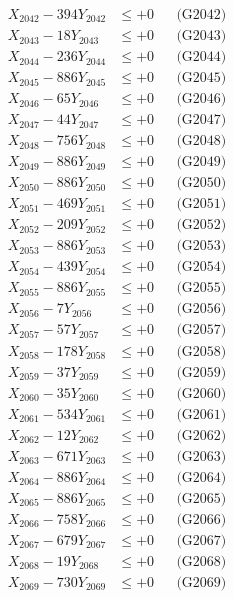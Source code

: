 \documentclass[a4paper,10pt]{article}
\begin{document}
{\begin{align}
X_{2042} - 394Y_{2042} &\leq +0 && \text{(G2042)} \\
X_{2043} - 18Y_{2043} &\leq +0 && \text{(G2043)} \\
X_{2044} - 236Y_{2044} &\leq +0 && \text{(G2044)} \\
X_{2045} - 886Y_{2045} &\leq +0 && \text{(G2045)} \\
X_{2046} - 65Y_{2046} &\leq +0 && \text{(G2046)} \\
X_{2047} - 44Y_{2047} &\leq +0 && \text{(G2047)} \\
X_{2048} - 756Y_{2048} &\leq +0 && \text{(G2048)} \\
X_{2049} - 886Y_{2049} &\leq +0 && \text{(G2049)} \\
X_{2050} - 886Y_{2050} &\leq +0 && \text{(G2050)} \\
\allowbreak
X_{2051} - 469Y_{2051} &\leq +0 && \text{(G2051)} \\
X_{2052} - 209Y_{2052} &\leq +0 && \text{(G2052)} \\
X_{2053} - 886Y_{2053} &\leq +0 && \text{(G2053)} \\
X_{2054} - 439Y_{2054} &\leq +0 && \text{(G2054)} \\
X_{2055} - 886Y_{2055} &\leq +0 && \text{(G2055)} \\
X_{2056} - 7Y_{2056} &\leq +0 && \text{(G2056)} \\
X_{2057} - 57Y_{2057} &\leq +0 && \text{(G2057)} \\
X_{2058} - 178Y_{2058} &\leq +0 && \text{(G2058)} \\
X_{2059} - 37Y_{2059} &\leq +0 && \text{(G2059)} \\
X_{2060} - 35Y_{2060} &\leq +0 && \text{(G2060)} \\
\allowbreak
X_{2061} - 534Y_{2061} &\leq +0 && \text{(G2061)} \\
X_{2062} - 12Y_{2062} &\leq +0 && \text{(G2062)} \\
X_{2063} - 671Y_{2063} &\leq +0 && \text{(G2063)} \\
X_{2064} - 886Y_{2064} &\leq +0 && \text{(G2064)} \\
X_{2065} - 886Y_{2065} &\leq +0 && \text{(G2065)} \\
X_{2066} - 758Y_{2066} &\leq +0 && \text{(G2066)} \\
X_{2067} - 679Y_{2067} &\leq +0 && \text{(G2067)} \\
X_{2068} - 19Y_{2068} &\leq +0 && \text{(G2068)} \\
X_{2069} - 730Y_{2069} &\leq +0 && \text{(G2069)} \\

\end{align}}
\end{document}
